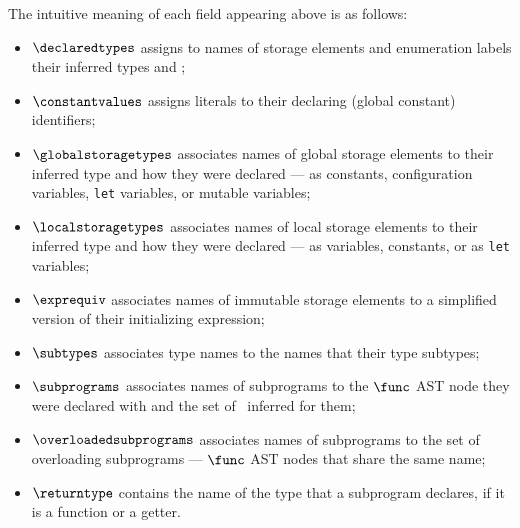 The intuitive meaning of each field appearing above is as follows:
\begin{itemize}
  \hypertarget{def-declaredtypes}{}
  \item $\declaredtypes$ assigns to names of storage elements and enumeration labels their inferred types and \purity{};
  \hypertarget{def-constantvalues}{}
  \item $\constantvalues$ assigns literals to their declaring (global constant) identifiers;
  \hypertarget{def-globalstoragetypes}{}
  \item $\globalstoragetypes$ associates names of global storage elements to their inferred type
  and how they were declared --- as constants, configuration variables, \texttt{let} variables,
  or mutable variables;
  \hypertarget{def-localstoragetypes}{}
  \item $\localstoragetypes$ associates names of local storage elements to their inferred type
  and how they were declared --- as variables, constants, or as \texttt{let} variables;
  \hypertarget{def-exprequiv}{}
  \item $\exprequiv$ associates names of immutable storage elements to a simplified version
  of their initializing expression;
  \hypertarget{def-subtypes}{}
  \item $\subtypes$ associates type names to the names that their type subtypes;
  \hypertarget{def-subprograms}{}
  \item $\subprograms$ associates names of subprograms to the $\func$ AST node they were
  declared with and the set of \sideeffectdescriptorsterm\ inferred for them;
  \hypertarget{def-overloadedsubprograms}{}
  \item $\overloadedsubprograms$ associates names of subprograms to the set of overloading
  subprograms ---  $\func$ AST nodes that share the same name;
  \hypertarget{def-returntype}{}
  \item $\returntype$ contains the name of the type that a subprogram declares, if it is
  a function or a getter.
\end{itemize}

